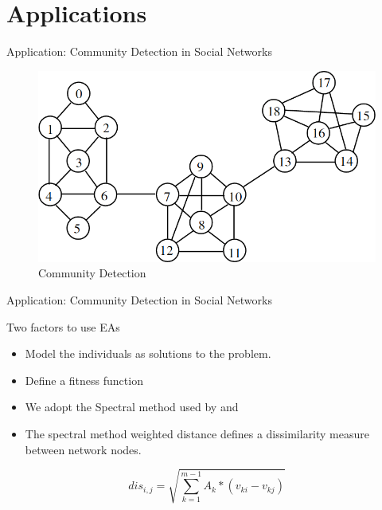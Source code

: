 \documentclass[table]{beamer}
\begin{document}
	\section{Applications}
	\begin{frame}{Application: Community Detection in Social Networks}
		\begin{figure}[v]
			\includegraphics[scale=0.43]{comm_detect}
			\centering
			\caption{Community Detection}
			\label{ref:comm_detect}
		\end{figure}		
	\end{frame}
	
	\begin{frame}{Application: Community Detection in Social Networks}
		\begin{block}{Two factors to use EAs}
			\begin{itemize}
				\item Model the individuals as solutions to the problem.
				\item Define a fitness function
			\end{itemize}
		\end{block}
		\begin{block}{}
			\begin{itemize}
				\item We adopt the Spectral method used by \cite{shi2009pso} and \cite{capocci2005detecting}
				\item The spectral method weighted distance defines a dissimilarity measure between network nodes. 
			\end{itemize}
		\end{block}
		\begin{equation}
			dis_{i,j}=\sqrt{\sum_{k=1}^{m-1}A_{k}*(\mathit{v_{ki}-v_{kj}})}
		\end{equation}
	\end{frame}
	
\end{document}
